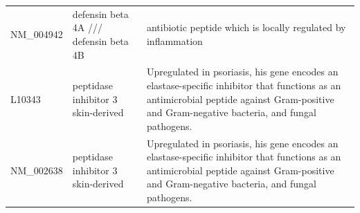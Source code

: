 \documentclass[10pt,a4paper]{article}
\begin{document}
\begin{table}[]
\begin{tabular}{l|p{5cm} p{8cm}}
			NM\_004942         & defensin  beta 4A /// defensin beta 4B                                                                                  & antibiotic peptide which is locally regulated by inflammation\cite{jansen2009beta}                                                                                                                                                                             \\
			L10343             & peptidase inhibitor 3  skin-derived                                                                                     & Upregulated in psoriasis, his gene encodes an elastase-specific inhibitor that functions as an antimicrobial peptide against Gram-positive and Gram-negative bacteria, and fungal pathogens.\cite{gudjonsson2010assessment, roesner2017inflammatory}                                              \\
			NM\_002638 &  peptidase inhibitor 3  skin-derived                                                                                           & Upregulated in psoriasis, his gene encodes an elastase-specific inhibitor that functions as an antimicrobial peptide against Gram-positive and Gram-negative bacteria, and fungal pathogens.\cite{gudjonsson2010assessment, roesner2017inflammatory}                                                                                        \\ \hline                                                                                                                                                                                                                                         
		\end{tabular}
	\end{table}
	
\end{document}
